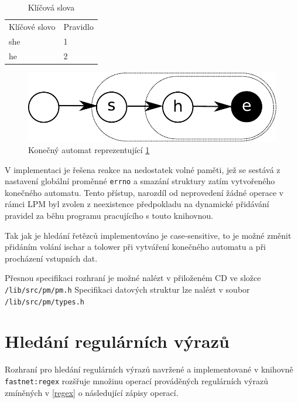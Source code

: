 \begin{table}[!htbp]
    \center
    \begin{tabular}{|l|l|}
    \hline
    Klíčové slovo & Pravidlo \\ \hhline{|=|=|}
    she & 1  \\ \hline
    he & 2 \\ \hline
    \end{tabular}
    \caption{Klíčová slova}
    \label{tab:ac:substr}
\end{table}

\begin{figure}[!htbp]
    \centering
    \includegraphics[scale=0.7]{fig/ac-substr.pdf}
    \caption{Konečný automat reprezentující \ref{tab:ac:substr}}
    \label{fig:ac:substr}
\end{figure}

V implementaci je řešena reakce na nedostatek volné paměti, jež se sestává z nastavení
globální proměnné \texttt{errno} a smazání struktury zatím vytvořeného konečného automatu.
Tento přístup, narozdíl od neprovedení žádné operace v rámci LPM byl zvolen z neexistence
předpokladu na dynamické přidávání pravidel za běhu programu pracujícího s touto knihovnou.

Tak jak je hledání řetězců implementováno je case-sensitive, to je možné změnit
přidáním volání ischar a tolower při vytváření konečného automatu a při procházení vstupních dat.

Přesnou specifikaci rozhraní je možné nalézt v přiloženém CD ve složce \texttt{/lib/src/pm/pm.h}
Specifikaci datových struktur lze nalézt v soubor \texttt{/lib/src/pm/types.h}

\section{Hledání regulárních výrazů}\label{api:regex}  %

Rozhraní pro hledání regulárních výrazů navržené a implementované v knihovně \texttt{fastnet:regex}
rozšřuje množinu operací prováděných regulárních výrazů zmíněných v \ref{regex} o následující zápisy operací.

